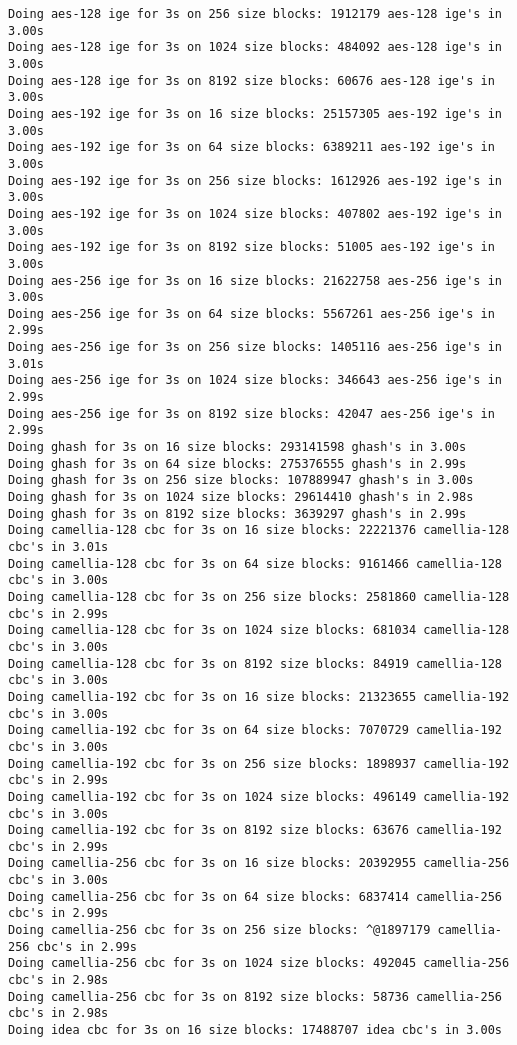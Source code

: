 \documentclass[%
 aip,
 jmp,%
 amsmath,amssymb,
 reprint,%
]{revtex4-1}
\begin{document}
\begin{verbatim}
Doing aes-128 ige for 3s on 256 size blocks: 1912179 aes-128 ige's in 3.00s
Doing aes-128 ige for 3s on 1024 size blocks: 484092 aes-128 ige's in 3.00s
Doing aes-128 ige for 3s on 8192 size blocks: 60676 aes-128 ige's in 3.00s
Doing aes-192 ige for 3s on 16 size blocks: 25157305 aes-192 ige's in 3.00s
Doing aes-192 ige for 3s on 64 size blocks: 6389211 aes-192 ige's in 3.00s
Doing aes-192 ige for 3s on 256 size blocks: 1612926 aes-192 ige's in 3.00s
Doing aes-192 ige for 3s on 1024 size blocks: 407802 aes-192 ige's in 3.00s
Doing aes-192 ige for 3s on 8192 size blocks: 51005 aes-192 ige's in 3.00s
Doing aes-256 ige for 3s on 16 size blocks: 21622758 aes-256 ige's in 3.00s
Doing aes-256 ige for 3s on 64 size blocks: 5567261 aes-256 ige's in 2.99s
Doing aes-256 ige for 3s on 256 size blocks: 1405116 aes-256 ige's in 3.01s
Doing aes-256 ige for 3s on 1024 size blocks: 346643 aes-256 ige's in 2.99s
Doing aes-256 ige for 3s on 8192 size blocks: 42047 aes-256 ige's in 2.99s
Doing ghash for 3s on 16 size blocks: 293141598 ghash's in 3.00s
Doing ghash for 3s on 64 size blocks: 275376555 ghash's in 2.99s
Doing ghash for 3s on 256 size blocks: 107889947 ghash's in 3.00s
Doing ghash for 3s on 1024 size blocks: 29614410 ghash's in 2.98s
Doing ghash for 3s on 8192 size blocks: 3639297 ghash's in 2.99s
Doing camellia-128 cbc for 3s on 16 size blocks: 22221376 camellia-128 cbc's in 3.01s
Doing camellia-128 cbc for 3s on 64 size blocks: 9161466 camellia-128 cbc's in 3.00s
Doing camellia-128 cbc for 3s on 256 size blocks: 2581860 camellia-128 cbc's in 2.99s
Doing camellia-128 cbc for 3s on 1024 size blocks: 681034 camellia-128 cbc's in 3.00s
Doing camellia-128 cbc for 3s on 8192 size blocks: 84919 camellia-128 cbc's in 3.00s
Doing camellia-192 cbc for 3s on 16 size blocks: 21323655 camellia-192 cbc's in 3.00s
Doing camellia-192 cbc for 3s on 64 size blocks: 7070729 camellia-192 cbc's in 3.00s
Doing camellia-192 cbc for 3s on 256 size blocks: 1898937 camellia-192 cbc's in 2.99s
Doing camellia-192 cbc for 3s on 1024 size blocks: 496149 camellia-192 cbc's in 3.00s
Doing camellia-192 cbc for 3s on 8192 size blocks: 63676 camellia-192 cbc's in 2.99s
Doing camellia-256 cbc for 3s on 16 size blocks: 20392955 camellia-256 cbc's in 3.00s
Doing camellia-256 cbc for 3s on 64 size blocks: 6837414 camellia-256 cbc's in 2.99s
Doing camellia-256 cbc for 3s on 256 size blocks: ^@1897179 camellia-256 cbc's in 2.99s
Doing camellia-256 cbc for 3s on 1024 size blocks: 492045 camellia-256 cbc's in 2.98s
Doing camellia-256 cbc for 3s on 8192 size blocks: 58736 camellia-256 cbc's in 2.98s
Doing idea cbc for 3s on 16 size blocks: 17488707 idea cbc's in 3.00s

\end{verbatim}
\end{document}
